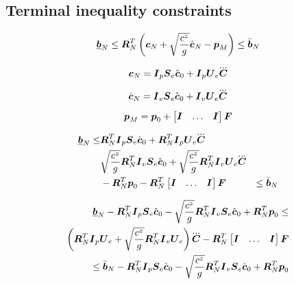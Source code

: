 
\subsection{Terminal inequality constraints}

\begin{equation*}
    \underbar{\mbox{\boldmath $b$}}_N 
    \le 
    \mbox{\boldmath $R$}_N^T
    \left(
        \mbox{\boldmath $c$}_N
        +
        \sqrt{\frac{c^z}{g}}
        \dot{\mbox{\boldmath $c$}}_N
        - 
        \mbox{\boldmath $p$}_M
    \right) 
    \le
    \bar{\mbox{\boldmath $b$}}_N
\end{equation*}

\begin{equation*}
    \cpos_N = \M{I}_p \M{S}_e \cstate_0     +   \M{I}_p \M{U}_e \cJerk
\end{equation*}

\begin{equation*}
    \cvel_N = \M{I}_v \M{S}_e \cstate_0     +   \M{I}_v \M{U}_e \cJerk
\end{equation*}

\begin{equation*}
    \mbox{\boldmath $p$}_M = \mbox{\boldmath $p$}_0 + \begin{bmatrix} \mbox{\boldmath $I$} & \dots & \mbox{\boldmath $I$} \end{bmatrix} \mbox{\boldmath $F$}
\end{equation*}


\begin{align*}
    \underbar{\V{b}}_N 
    \le &
      \M{R}_N^T \M{I}_p \M{S}_e \cstate_0   +  \M{R}_N^T \M{I}_p \M{U}_e \cJerk & \\
    & \sqrt{\frac{c^z}{g}} \M{R}_N^T \M{I}_v \M{S}_e \cstate_0   +  \sqrt{\frac{c^z}{g}} \M{R}_N^T \M{I}_v \M{U}_e \cJerk & \\
    & - \M{R}_N^T \fp_0   -   \M{R}_N^T  \begin{bmatrix} \M{I} & \dots & \M{I} \end{bmatrix} \FD  & 
    \le
    \bar{\V{b}}_N
\end{align*}


\begin{align*}
    \underbar{\V{b}}_N  
    -  
    \M{R}_N^T \M{I}_p \M{S}_e \cstate_0   
    -   
    \sqrt{\frac{c^z}{g}} \M{R}_N^T \M{I}_v \M{S}_e \cstate_0 
    +
    \M{R}_N^T \fp_0 
    \le \\
       \left( \M{R}_N^T \M{I}_p \M{U}_e  +  \sqrt{\frac{c^z}{g}} \M{R}_N^T \M{I}_v \M{U}_e \right) \cJerk
      -  \M{R}_N^T  \begin{bmatrix} \M{I} & \dots & \M{I} \end{bmatrix} \FD  \\ 
    \le
    \bar{\V{b}}_N
    -  
    \M{R}_N^T \M{I}_p \M{S}_e \cstate_0   
    -   
    \sqrt{\frac{c^z}{g}} \M{R}_N^T \M{I}_v \M{S}_e \cstate_0 
    +
    \M{R}_N^T \fp_0 
\end{align*}


